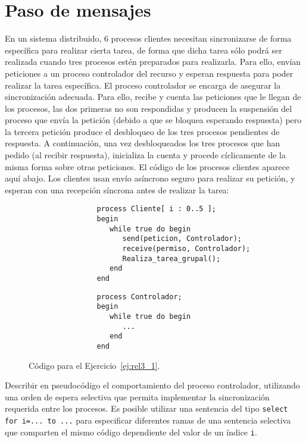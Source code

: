\section{Paso de mensajes}

\begin{ejercicio}\label{ej:rel3_1}
    En un sistema distribuido, 6 procesos clientes necesitan sincronizarse de forma específica para realizar cierta tarea, de forma que dicha tarea sólo podrá ser realizada cuando tres procesos estén preparados para realizarla. Para ello, envían peticiones a un proceso controlador del recurso y esperan respuesta para poder realizar la tarea específica. El proceso controlador se encarga de asegurar la sincronización adecuada. Para ello, recibe y cuenta las peticiones que le llegan de los procesos, las dos primeras no son respondidas y producen la suspensión del proceso que envía la petición (debido a que se bloquea esperando respuesta) pero la tercera petición produce el desbloqueo de los tres procesos pendientes de respuesta. A continuación, una vez desbloqueados los tres procesos que han pedido (al recibir respuesta), inicializa la cuenta y procede cíclicamente de la misma forma sobre otras peticiones. El código de los procesos clientes aparece aquí abajo. Los clientes usan envío asíncrono seguro para realizar su petición, y esperan con una recepción síncrona antes de realizar la tarea:
    \begin{figure}[H]
        \centering
        \setlength{\columnsep}{1cm}
        \begin{multicols}{2}
            \begin{verbatim}
                process Cliente[ i : 0..5 ];
                begin
                   while true do begin
                      send(peticion, Controlador);
                      receive(permiso, Controlador);
                      Realiza_tarea_grupal();
                   end
                end
            \end{verbatim}
            \begin{verbatim}
                process Controlador;
                begin
                   while true do begin
                      ...
                   end
                end
            \end{verbatim}
        \end{multicols}
        \caption{Código para el Ejercicio~\ref{ej:rel3_1}.}
        \label{fig:cod_1}
    \end{figure}
    Describir en pseudocódigo el comportamiento del proceso controlador, utilizando una orden de espera selectiva que permita implementar la sincronización requerida entre los procesos. Es posible utilizar una sentencia del tipo \verb|select for i=... to ...| para especificar diferentes ramas de una sentencia selectiva que comparten el mismo código dependiente del valor de un índice \verb|i|.\\


\end{ejercicio}
